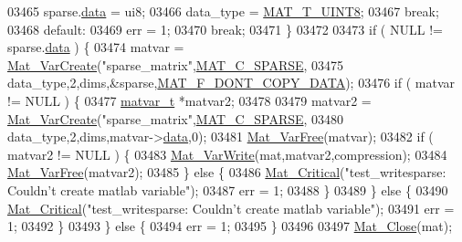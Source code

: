 \begin{DoxyCode}
{{{{{{{{{{{{{{{{{{{{{{{{{{{{{{{{{{{{{{{{{{{{{{{{{{{{{{{{{{{{03465             sparse.\hyperlink{group___m_a_t_ae2c648cb9eac4ce47f26cddb44246152}{data}  = ui8;
03466             data\_type = \hyperlink{group___m_a_t_ggacf7b3b879282b7ab3a51190e49bf3453a01c1bd7db68f90552862eb5d311be408}{MAT\_T\_UINT8};
03467             \textcolor{keywordflow}{break};
03468         \textcolor{keywordflow}{default}:
03469             err = 1;
03470             \textcolor{keywordflow}{break};
03471     \}
03472 
03473     \textcolor{keywordflow}{if} ( NULL != sparse.\hyperlink{group___m_a_t_ae2c648cb9eac4ce47f26cddb44246152}{data} ) \{
03474         matvar = \hyperlink{group___m_a_t_ga1c54a84bb4d810c6fccdb8869489eac4}{Mat\_VarCreate}(\textcolor{stringliteral}{"sparse\_matrix"},\hyperlink{group___m_a_t_ggad4d60ae7b709fc81bfd744fb4c857c40a0d5655b7e6178a2242cb3bb56ff4c8d2}{MAT\_C\_SPARSE},
03475                        data\_type,2,dims,&sparse,\hyperlink{group___m_a_t_ggab9d6ef9e3ddca78a317b173f01d53fbba762244499f52eb35e7b53fb79a1f2889}{MAT\_F\_DONT\_COPY\_DATA});
03476         \textcolor{keywordflow}{if} ( matvar != NULL ) \{
03477             \hyperlink{group___m_a_t_structmatvar__t}{matvar\_t} *matvar2;
03478 
03479             matvar2 = \hyperlink{group___m_a_t_ga1c54a84bb4d810c6fccdb8869489eac4}{Mat\_VarCreate}(\textcolor{stringliteral}{"sparse\_matrix"},\hyperlink{group___m_a_t_ggad4d60ae7b709fc81bfd744fb4c857c40a0d5655b7e6178a2242cb3bb56ff4c8d2}{MAT\_C\_SPARSE},
03480                        data\_type,2,dims,matvar->\hyperlink{group___m_a_t_a5672978efa230bbdecdf38ede781f7fa}{data},0);
03481             \hyperlink{group___m_a_t_ga1d14716f7450530fd1c9d02413787f0e}{Mat\_VarFree}(matvar);
03482             \textcolor{keywordflow}{if} ( matvar2 != NULL ) \{
03483                 \hyperlink{group___m_a_t_ga4bd3eba12df415d8226e27c457fbbb0b}{Mat\_VarWrite}(mat,matvar2,compression);
03484                 \hyperlink{group___m_a_t_ga1d14716f7450530fd1c9d02413787f0e}{Mat\_VarFree}(matvar2);
03485             \} \textcolor{keywordflow}{else} \{
03486                 \hyperlink{group__mat__util_gaf51f2bfbb5580f575e4dd79757e2b80c}{Mat\_Critical}(\textcolor{stringliteral}{"test\_writesparse: Couldn't create matlab variable"});
03487                 err = 1;
03488             \}
03489         \} \textcolor{keywordflow}{else} \{
03490             \hyperlink{group__mat__util_gaf51f2bfbb5580f575e4dd79757e2b80c}{Mat\_Critical}(\textcolor{stringliteral}{"test\_writesparse: Couldn't create matlab variable"});
03491             err = 1;
03492         \}
03493     \} \textcolor{keywordflow}{else} \{
03494         err = 1;
03495     \}
03496 
03497     \hyperlink{group___m_a_t_ga101c92ff7bde4a2d4615661beba09262}{Mat\_Close}(mat);
}}}}}}}}}}}}}}}}}}}}}}}}}}}}}}}}}}}}}}}}}}}}}}}}}}}}}}}}}}}}
\end{DoxyCode}
